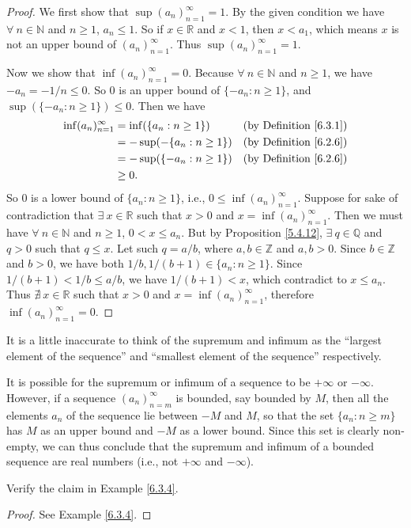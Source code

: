 \begin{proof}
We first show that \(\sup(a_n)_{n = 1}^\infty = 1\).
By the given condition we have \(\forall\ n \in \mathds{N}\) and \(n \geq 1\), \(a_n \leq 1\).
So if \(x \in \mathds{R}\) and \(x < 1\), then \(x < a_1\), which means \(x\) is not an upper bound of \((a_n)_{n = 1}^\infty\).
Thus \(\sup(a_n)_{n = 1}^\infty = 1\).

Now we show that \(\inf(a_n)_{n = 1}^\infty = 0\).
Because \(\forall\ n \in \mathds{N}\) and \(n \geq 1\), we have \(-a_n = -1 / n \leq 0\).
So \(0\) is an upper bound of \(\{-a_n : n \geq 1\}\), and \(\sup(\{-a_n : n \geq 1\}) \leq 0\).
Then we have
\begin{align*}
\inf(a_n)_{n = 1}^\infty &= \inf(\{a_n : n \geq 1\}) & \text{(by Definition \ref{6.3.1})} \\
&= -\sup(-\{a_n : n \geq 1\}) & \text{(by Definition \ref{6.2.6})} \\
&= -\sup(\{-a_n : n \geq 1\}) & \text{(by Definition \ref{6.2.6})} \\
&\geq 0.
\end{align*}
So \(0\) is a lower bound of \(\{a_n : n \geq 1\}\), i.e., \(0 \leq \inf(a_n)_{n = 1}^\infty\).
Suppose for sake of contradiction that \(\exists\ x \in \mathds{R}\) such that \(x > 0\) and \(x = \inf(a_n)_{n = 1}^\infty\).
Then we must have \(\forall\ n \in \mathds{N}\) and \(n \geq 1\), \(0 < x \leq a_n\).
But by Proposition \ref{5.4.12}, \(\exists\ q \in \mathds{Q}\) and \(q > 0\) such that \(q \leq x\).
Let such \(q = a / b\), where \(a, b \in \mathds{Z}\) and \(a, b > 0\).
Since \(b \in \mathds{Z}\) and \(b > 0\), we have both \(1 / b, 1 / (b + 1) \in \{a_n : n \geq 1\}\).
Since \(1 / (b + 1) < 1 / b \leq a / b\), we have \(1 / (b + 1) < x\), which contradict to \(x \leq a_n\).
Thus \(\nexists\ x \in \mathds{R}\) such that \(x > 0\) and \(x = \inf(a_n)_{n = 1}^\infty\), therefore \(\inf(a_n)_{n = 1}^\infty = 0\).
\end{proof}

\begin{note}
It is a little inaccurate to think of the supremum and infimum as the ``largest element of the sequence'' and ``smallest element of the sequence'' respectively.
\end{note}

\begin{note}
It is possible for the supremum or infimum of a sequence to be \(+\infty\) or \(-\infty\).
However, if a sequence \((a_n)_{n = m}^\infty\) is bounded, say bounded by \(M\), then all the elements \(a_n\) of the sequence lie between \(-M\) and \(M\), so that the set \(\{a_n : n \geq m\}\) has \(M\) as an upper bound and \(-M\) as a lower bound.
Since this set is clearly non-empty, we can thus conclude that the supremum and infimum of a bounded sequence are real numbers (i.e., not \(+\infty\) and \(-\infty\)).
\end{note}

\exercisesection

\begin{exercise}\label{ex 6.3.1}
Verify the claim in Example \ref{6.3.4}.
\end{exercise}

\begin{proof}
See Example \ref{6.3.4}.
\end{proof}